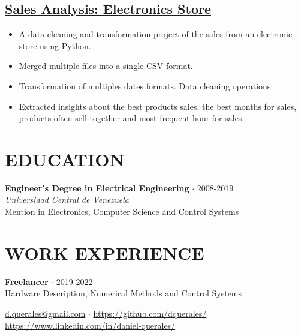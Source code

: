 \documentclass[10pt]{article} %
\def\ucv{Universidad Central de Venezuela}
\begin{document}
\subsection*{\href{https://github.com/dquerales/DataScience/tree/main/Sales\%20Analysis}{Sales Analysis: Electronics Store}}

\begin{itemize}
\itemsep0em
\item A data cleaning and transformation project of the sales from an electronic store using Python.
\item Merged multiple files into a single CSV format. 
\item Transformation of multiples dates formats. Data cleaning operations.
\item Extracted insights about the best products sales, the best months for sales, products often sell together and most frequent hour for sales.
\end{itemize}

\section*{EDUCATION}

\textbf{Engineer's Degree in Electrical Engineering} $\cdot$ 2008-2019 \\ 
\emph{\ucv}\\
Mention in Electronics, Computer Science and Control Systems

\section*{WORK EXPERIENCE}

\textbf{Freelancer} $\cdot$ 2019-2022 \\ 
Hardware Description, Numerical Methods and Control Systems

\vfill
\centering
\href{mailto:d.querales@gmail.com}{d.querales@gmail.com} $\cdot$ %
\url{https://github.com/dquerales/} %
\url{https://www.linkedin.com/in/daniel-querales/} %
\end{document}
